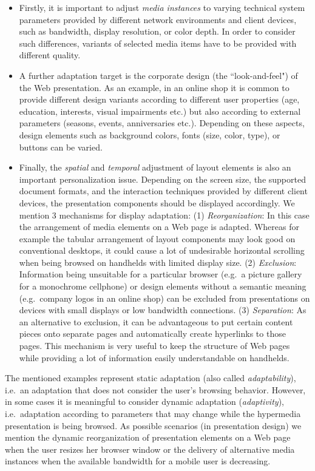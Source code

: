 \documentclass[oribibl]{llncs}
\begin{document}
\begin{itemize}
\item Firstly, it is important to adjust \emph{media instances} to varying technical system parameters provided by different network environments and client devices, such as bandwidth, display resolution, or color depth.
In order to consider such differences, variants of selected media items have to be provided with different quality.
\item A further adaptation target is the corporate design (the ``look-and-feel") of the Web presentation. 
As an example, in an online shop it is common to provide different design variants according to different user properties (age, education, interests, visual impairments etc.) but also according to external parameters (seasons, events, anniversaries etc.).
Depending on these aspects, design elements such as background colors, fonts (size, color, type), or buttons can be varied.
\item Finally, the \emph{spatial} and \emph{temporal} adjustment of layout elements is also an important personalization issue.
Depending on the screen size, the supported document formats, and the interaction techniques provided by different client devices, the presentation components should be displayed accordingly. We mention 3 mechanisms for display adaptation:
(1) \emph{Reorganization}:
In this case the arrangement of media elements on a Web page is adapted.
Whereas for example the tabular arrangement of layout components may look good on conventional desktops, it could cause 
a lot of undesirable horizontal scrolling when being browsed on handhelds with limited display size.
(2) \emph{Exclusion}:
Information being unsuitable for a particular browser (e.g.\ a picture gallery for a monochrome cellphone) or design elements without a semantic meaning (e.g.\ company logos in an online shop) can be excluded from presentations on devices with small displays or low bandwidth connections.
(3) \emph{Separation}:
As an alternative to exclusion, it can be advantageous to put certain content pieces onto separate pages and automatically create hyperlinks to those pages.
This mechanism is very useful to keep the structure of Web pages while providing a lot of information easily understandable on handhelds.
\end{itemize}

The mentioned examples represent static adaptation (also called \emph{adaptability}), i.e.\ an adaptation that does not consider the user's browsing behavior.
However, in some cases it is meaningful to consider dynamic adaptation (\emph{adaptivity}), i.e.\ adaptation according to parameters that may change while the hypermedia presentation is being browsed.
As possible scenarios (in presentation design) we mention the dynamic reorganization of presentation elements on a Web page when the user resizes her browser window or the delivery of alternative media instances when the available bandwidth for a mobile user is decreasing.
\end{document}
